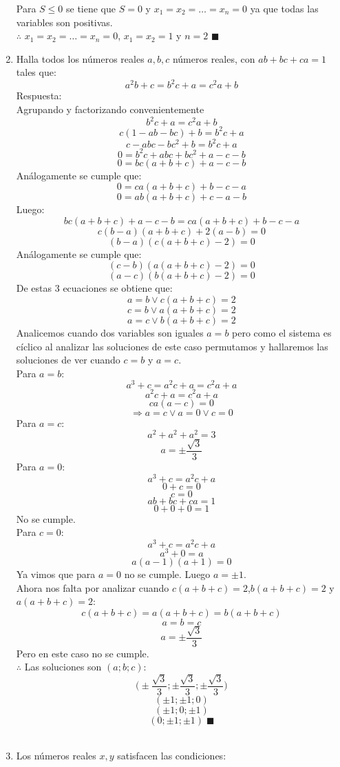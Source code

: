 \documentclass{book}
\begin{document}
\begin{enumerate}
        Para $S\leq 0$ se tiene que $S=0$ y $x_1=x_2=\ldots=x_n=0$ ya que todas las variables son positivas.\\
        $\therefore$ $x_1=x_2=\ldots=x_n=0$, $x_1=x_2=1$ y $n=2$ $\blacksquare$\\
        \item Halla todos los números reales $a,b,c$ números reales, con $ab+bc+ca=1$ tales que:
        $$a^2b+c=b^2c+a=c^2a+b$$
        Respuesta:\\
        Agrupando y factorizando convenientemente
        $$b^2 c+a=c^2 a+b$$
        $$c(1-ab-bc)+b=b^2 c+a$$
        $$c-abc-bc^2+b=b^2 c+a$$
        $$0=b^2 c+abc+bc^2+a-c-b$$
        $$0=bc(a+b+c)+a-c-b$$
        Análogamente se cumple que:
        $$0=ca(a+b+c)+b-c-a$$
        $$0=ab(a+b+c)+c-a-b$$
        Luego:
        $$bc(a+b+c)+a-c-b=ca(a+b+c)+b-c-a$$
        $$c(b-a)(a+b+c)+2(a-b)=0$$
        $$(b-a)(c(a+b+c)-2)=0$$
        Análogamente se cumple que:
        $$(c-b)(a(a+b+c)-2)=0$$
        $$(a-c)(b(a+b+c)-2)=0$$
        De estas 3 ecuaciones se obtiene que:
        $$a=b \vee c(a+b+c)=2$$
        $$c=b \vee a(a+b+c)=2$$
        $$a=c \vee b(a+b+c)=2$$
        Analicemos cuando dos variables son iguales $a=b$ pero como el sistema es cíclico al analizar las soluciones de este caso permutamos y hallaremos las soluciones de ver cuando $c=b$ y $a=c$.\\
        Para $a=b$:
        $$a^3+c=a^2 c+a=c^2 a+a$$
        $$a^2 c+a=c^2 a+a$$
        $$ca(a-c)=0$$
        $$\Rightarrow a=c \vee a=0 \vee c=0$$
        Para $a=c$:
        $$a^2+a^2+a^2=3$$
        $$a=\pm\frac{\sqrt{3}}{3}$$
        Para $a=0$:
        $$a^3+c=a^2 c+a$$
        $$0+c=0$$
        $$c=0$$
        $$ab+bc+ca=1$$
        $$0+0+0=1$$
        No se cumple.\\
        Para $c=0$:
        $$a^3+c=a^2 c+a$$
        $$a^3+0=a$$
        $$a(a-1)(a+1)=0$$
        Ya vimos que para $a=0$ no se cumple. Luego $a=\pm 1$.\\
        Ahora nos falta por analizar cuando $c(a+b+c)=2$,$b(a+b+c)=2$ y $a(a+b+c)=2$:
        $$c(a+b+c)=a(a+b+c)=b(a+b+c)$$
        $$a=b=c$$
        $$a=\pm\frac{\sqrt{3}}{3}$$
        Pero en este caso no se cumple.\\
        $\therefore$ Las soluciones son $(a;b;c)$:
        $$\bigg(\pm\frac{\sqrt{3}}{3};\pm\frac{\sqrt{3}}{3};\pm\frac{\sqrt{3}}{3}\bigg)$$
        $$(\pm 1; \pm 1;0)$$
        $$(\pm 1;0;\pm 1)$$
        $$(0;\pm 1;\pm 1)\;\blacksquare$$ \\
        \item Los números reales $x,y$ satisfacen las condiciones:

\end{enumerate}
\end{document}
